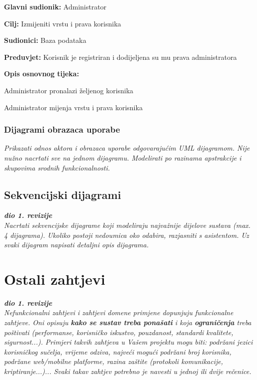 					\noindent {}
					\begin{packed_item}
						\item \textbf{Glavni sudionik: }Administrator
						\item  \textbf{Cilj:} Izmijeniti vrstu i prava korisnika
						\item  \textbf{Sudionici:} Baza podataka
						\item  \textbf{Preduvjet:} Korisnik je registriran i dodijeljena su mu prava administratora
						\item  \textbf{Opis osnovnog tijeka:}
						\item[] \begin{packed_enum}
							\item Administrator pronalazi željenog korisnika
							\item Administrator mijenja vrstu i prava korisnika \\
						\end{packed_enum}
					\end{packed_item}
				
					
				\subsubsection{Dijagrami obrazaca uporabe}
					
					\textit{Prikazati odnos aktora i obrazaca uporabe odgovarajućim UML dijagramom. Nije nužno nacrtati sve na jednom dijagramu. Modelirati po razinama apstrakcije i skupovima srodnih funkcionalnosti.}
				\eject		
				
			\subsection{Sekvencijski dijagrami}
				
				\textbf{\textit{dio 1. revizije}}\\
				
				\textit{Nacrtati sekvencijske dijagrame koji modeliraju najvažnije dijelove sustava (max. 4 dijagrama). Ukoliko postoji nedoumica oko odabira, razjasniti s asistentom. Uz svaki dijagram napisati detaljni opis dijagrama.}
				\eject
	
		\section{Ostali zahtjevi}
		
			\textbf{\textit{dio 1. revizije}}\\
		 
			 \textit{Nefunkcionalni zahtjevi i zahtjevi domene primjene dopunjuju funkcionalne zahtjeve. Oni opisuju \textbf{kako se sustav treba ponašati} i koja \textbf{ograničenja} treba poštivati (performanse, korisničko iskustvo, pouzdanost, standardi kvalitete, sigurnost...). Primjeri takvih zahtjeva u Vašem projektu mogu biti: podržani jezici korisničkog sučelja, vrijeme odziva, najveći mogući podržani broj korisnika, podržane web/mobilne platforme, razina zaštite (protokoli komunikacije, kriptiranje...)... Svaki takav zahtjev potrebno je navesti u jednoj ili dvije rečenice.}
			 
			 
			 
	
